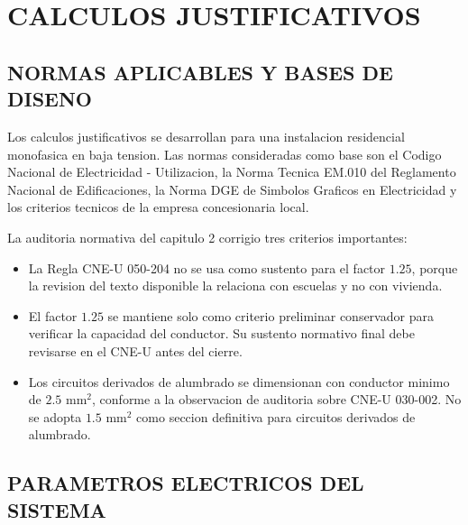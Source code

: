 \chapter*{CALCULOS JUSTIFICATIVOS}

\setcounter{section}{0}
\renewcommand{\thesection}{2.\arabic{section}.}
\renewcommand{\thesubsection}{2.\arabic{section}.\arabic{subsection}.}
\renewcommand{\thesubsubsection}{2.\arabic{section}.\arabic{subsection}.\arabic{subsubsection}.}
\renewcommand{\theHsection}{calculos.\arabic{section}}
\renewcommand{\theHsubsection}{calculos.\arabic{section}.\arabic{subsection}}
\renewcommand{\theHsubsubsection}{calculos.\arabic{section}.\arabic{subsection}.\arabic{subsubsection}}

\section{NORMAS APLICABLES Y BASES DE DISENO}

Los calculos justificativos se desarrollan para una instalacion residencial monofasica en baja tension. Las normas consideradas como base son el Codigo Nacional de Electricidad - Utilizacion, la Norma Tecnica EM.010 del Reglamento Nacional de Edificaciones, la Norma DGE de Simbolos Graficos en Electricidad y los criterios tecnicos de la empresa concesionaria local.

La auditoria normativa del capitulo 2 corrigio tres criterios importantes:
\begin{itemize}
  \item La Regla CNE-U 050-204 no se usa como sustento para el factor \(1.25\), porque la revision del texto disponible la relaciona con escuelas y no con vivienda.
  \item El factor \(1.25\) se mantiene solo como criterio preliminar conservador para verificar la capacidad del conductor. Su sustento normativo final debe revisarse en el CNE-U antes del cierre.
  \item Los circuitos derivados de alumbrado se dimensionan con conductor minimo de \(2.5\text{ mm}^2\), conforme a la observacion de auditoria sobre CNE-U 030-002. No se adopta \(1.5\text{ mm}^2\) como seccion definitiva para circuitos derivados de alumbrado.
\end{itemize}

\section{PARAMETROS ELECTRICOS DEL SISTEMA}

